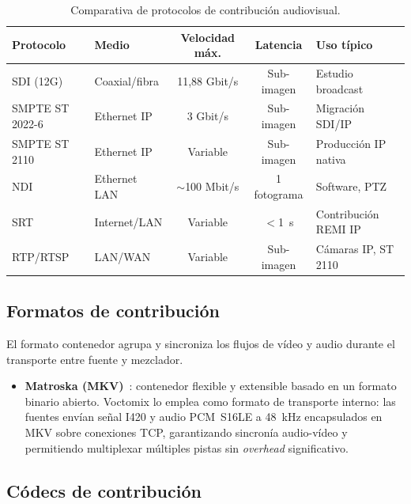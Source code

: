 \begin{table}[H]
  \centering
  \caption{Comparativa de protocolos de contribución audiovisual.}
  \label{tab:contrib_interfaces}
  \small
  \begin{tabularx}{\linewidth}{|l|l|c|c|X|}
    \hline
    \textbf{Protocolo} & \textbf{Medio} & \textbf{Velocidad máx.} & \textbf{Latencia} & \textbf{Uso típico} \\
    \hline
    SDI (12G)       & Coaxial/fibra & 11{,}88 Gbit/s & Sub-imagen   & Estudio broadcast \\
    SMPTE ST 2022-6 & Ethernet IP   & 3 Gbit/s       & Sub-imagen   & Migración SDI/IP \\
    SMPTE ST 2110   & Ethernet IP   & Variable       & Sub-imagen   & Producción IP nativa \\
    NDI             & Ethernet LAN  & $\sim$100 Mbit/s & 1 fotograma & Software, PTZ \\
    SRT             & Internet/LAN  & Variable       & $<$1~s       & Contribución REMI IP \\
    RTP/RTSP        & LAN/WAN       & Variable       & Sub-imagen   & Cámaras IP, ST 2110 \\
    \hline
  \end{tabularx}
\end{table}

\subsection{Formatos de contribución}

El formato contenedor agrupa y sincroniza los flujos de vídeo y audio durante el
transporte entre fuente y mezclador.

\begin{itemize}
  \item \textbf{Matroska (MKV)}~\cite{matroska_spec}: contenedor flexible y extensible
  basado en un formato binario abierto. Voctomix lo emplea como formato de transporte
  interno: las fuentes envían señal I420 y audio PCM~S16LE a 48~kHz encapsulados en MKV
  sobre conexiones TCP, garantizando sincronía audio-vídeo y permitiendo multiplexar
  múltiples pistas sin \textit{overhead} significativo.
\end{itemize}

\subsection{Códecs de contribución}

